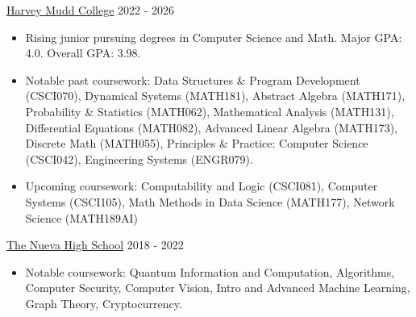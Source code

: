 \documentclass[9pt]{resume}
\begin{document}
    \vspace{-0.2cm}
    \begin{experiencelist}
        \experiencenocompany 
            {\href{https://www.hmc.edu/}{Harvey Mudd College}}
            {2022 - 2026}
            {\begin{itemize}[noitemsep, topsep=1pt]
                \item {Rising junior pursuing degrees in Computer Science and Math. Major GPA: 4.0. Overall GPA: 3.98. }
                \item {Notable past coursework: Data Structures \& Program Development (CSCI070), Dynamical Systems (MATH181), Abstract Algebra (MATH171), Probability \& Statistics (MATH062), Mathematical Analysis (MATH131), Differential Equations (MATH082), Advanced Linear Algebra (MATH173), Discrete Math (MATH055), Principles \& Practice: Computer Science (CSCI042), Engineering Systems (ENGR079).}
                \item {Upcoming coursework: Computability and Logic (CSCI081), Computer Systems (CSCI105), Math Methods in Data Science (MATH177), Network Science (MATH189AI)}
            \end{itemize}}
        \experiencenocompany
            {\href{https://www.nuevaschool.org/}{The Nueva High School}}
            {2018 - 2022}
            {\begin{itemize}[noitemsep, topsep=1pt]
                \item Notable coursework: Quantum Information and Computation, Algorithms, Computer Security, Computer Vision, Intro and Advanced Machine Learning, Graph Theory, Cryptocurrency.
            \end{itemize}}
    \end{experiencelist}
\end{document}
